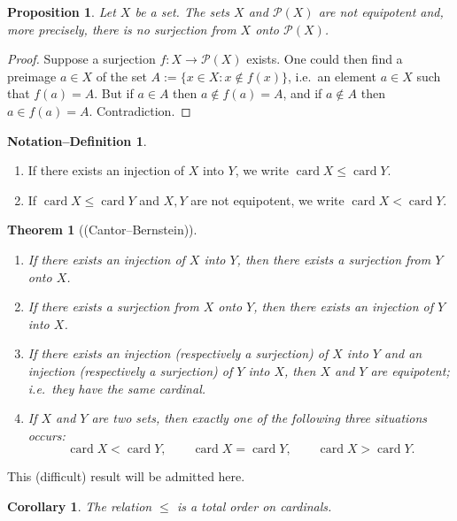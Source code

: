 \documentclass[12pt]{article}
\newtheorem{theorem}{Theorem}[section]
\newtheorem{proposition}{Proposition}[section]
\newtheorem{corollary}{Corollary}[section]
\theoremstyle{definition}
\newtheorem{notationdef}{Notation–Definition}[section]
\begin{document}
\begin{proposition}
Let $X$ be a set.
The sets $X$ and $\mathcal P(X)$ are not equipotent and, more precisely, there is no surjection from $X$ onto $\mathcal P(X)$.
\end{proposition}

\begin{proof}
Suppose a surjection $f:X\to\mathcal P(X)$ exists.
One could then find a preimage $a\in X$ of the set $A:=\{x\in X : x\notin f(x)\}$, i.e.\ an element $a\in X$ such that $f(a)=A$.
But if $a\in A$ then $a\notin f(a)=A$, and if $a\notin A$ then $a\in f(a)=A$.
Contradiction.
\end{proof}

\begin{notationdef}
\begin{enumerate}[label=(\alph*),leftmargin=2em]
\item If there exists an injection of $X$ into $Y$, we write $\operatorname{card} X \le \operatorname{card} Y$.
\item If $\operatorname{card} X \le \operatorname{card} Y$ and $X,Y$ are not equipotent, we write $\operatorname{card} X < \operatorname{card} Y$.
\end{enumerate}
\end{notationdef}

\begin{theorem}[(Cantor--Bernstein)]
\begin{enumerate}[label=(\alph*),leftmargin=2em]
\item If there exists an injection of $X$ into $Y$, then there exists a surjection from $Y$ onto $X$.
\item If there exists a surjection from $X$ onto $Y$, then there exists an injection of $Y$ into $X$.
\item If there exists an injection (respectively a surjection) of $X$ into $Y$ and an injection (respectively a surjection) of $Y$ into $X$, then $X$ and $Y$ are equipotent; i.e.\ they have the same cardinal.
\item If $X$ and $Y$ are two sets, then exactly one of the following three situations occurs:
\[
\operatorname{card} X < \operatorname{card} Y,\qquad
\operatorname{card} X = \operatorname{card} Y,\qquad
\operatorname{card} X > \operatorname{card} Y .
\]
\end{enumerate}
\end{theorem}

This (difficult) result will be admitted here.

\begin{corollary}
The relation $\le$ is a total order on cardinals.
\end{corollary}
\end{document}
